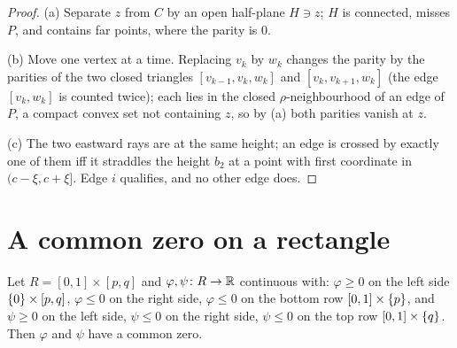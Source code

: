 \begin{proof}
(a) Separate $z$ from $C$ by an open half-plane $H\ni z$; $H$ is connected, misses $P$, and contains far points, where the parity is $0$.

(b) Move one vertex at a time. Replacing $v_k$ by $w_k$ changes the parity by the parities of the two closed triangles $[v_{k-1},v_k,w_k]$ and
$[v_k,v_{k+1},w_k]$ (the edge $[v_k,w_k]$ is counted twice); each lies in the closed $\rho$-neighbourhood of an edge of $P$, a compact convex set
not containing $z$, so by (a) both parities vanish at $z$.

(c) The two eastward rays are at the same height; an edge is crossed by exactly one of them iff it straddles the height $b_2$ at a point
with first coordinate in $(c-\xi,c+\xi]$. Edge $i$ qualifies, and no other edge does.
\end{proof}


\section{A common zero on a rectangle}

\begin{lemma}\label{lem:common-zero}
Let $R=[0,1]\times[p,q]$ and $\varphi,\psi\colon R\to\mathbb{R}$ continuous with: $\varphi\ge0$ on the left side $\left\{ 0 \right\}\times[p,q]$, $\varphi\le0$ on the right side, $\varphi\le0$ on
the bottom row $[0,1]\times\left\{ p \right\}$, and $\psi\ge0$ on the left side, $\psi\le0$ on the right side, $\psi\le0$ on the top row $[0,1]\times\left\{ q \right\}$. Then $\varphi$ and
$\psi$ have a common zero.
\end{lemma}

